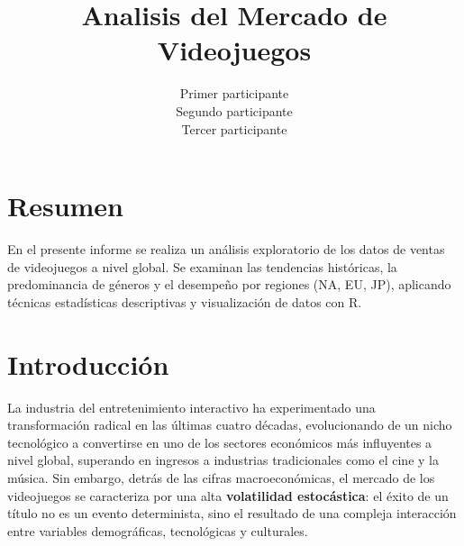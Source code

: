 \documentclass[oneside,11pt]{Latex/Classes/PhDthesisPSnPDF}
\title{Analisis del Mercado de Videojuegos}
\author{Primer participante \\ Segundo participante \\ Tercer
participante}
\begin{document}
\maketitle

\frontmatter


\setcounter{secnumdepth}{3}
\setcounter{tocdepth}{3}

\tableofcontents



\cleardoublepage

  \cleardoublepage       %
  \chapter*{Resumen}     %
  
  En el presente informe se realiza un análisis exploratorio de los
datos de ventas de videojuegos a nivel global. Se examinan las
tendencias históricas, la predominancia de géneros y el desempeño por
regiones (NA, EU, JP), aplicando técnicas estadísticas descriptivas y
visualización de datos con
R.             %
  
  \cleardoublepage

\mainmatter
\def\baselinestretch{1.5}

\chapter*{Introducción}

La industria del entretenimiento interactivo ha experimentado una
transformación radical en las últimas cuatro décadas, evolucionando de
un nicho tecnológico a convertirse en uno de los sectores económicos más
influyentes a nivel global, superando en ingresos a industrias
tradicionales como el cine y la música. Sin embargo, detrás de las
cifras macroeconómicas, el mercado de los videojuegos se caracteriza por
una alta \textbf{volatilidad estocástica}: el éxito de un título no es
un evento determinista, sino el resultado de una compleja interacción
entre variables demográficas, tecnológicas y culturales.
\end{document}
